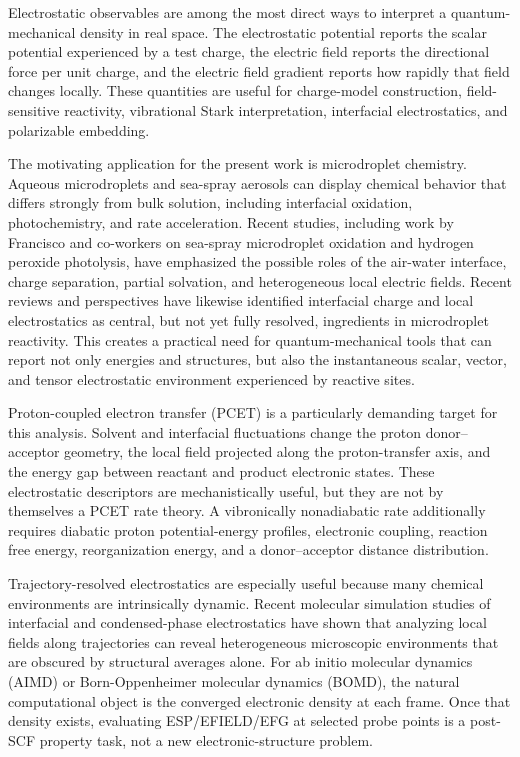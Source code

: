 \documentclass[journal=jctcce,manuscript=article,email=false]{achemso}
\begin{document}
Electrostatic observables are among the most direct ways to interpret a
quantum-mechanical density in real space.  The electrostatic potential
reports the scalar potential experienced by a test charge, the electric
field reports the directional force per unit charge, and the electric
field gradient reports how rapidly that field changes locally.  These
quantities are useful for charge-model construction, field-sensitive
reactivity, vibrational Stark interpretation, interfacial electrostatics,
and polarizable embedding.

The motivating application for the present work is microdroplet chemistry.
Aqueous microdroplets and sea-spray aerosols can display chemical behavior
that differs strongly from bulk solution, including interfacial oxidation,
photochemistry, and rate acceleration.  Recent studies, including work by
Francisco and co-workers on sea-spray microdroplet oxidation and hydrogen
peroxide photolysis, have emphasized the possible roles of the air-water
interface, charge separation, partial solvation, and heterogeneous local
electric fields.\cite{RaoFranciscoThiol2023,RaoFranciscoH2O22023}
Recent reviews and perspectives have likewise identified interfacial
charge and local electrostatics as central, but not yet fully resolved,
ingredients in microdroplet reactivity.\cite{LaCourHeadGordon2025}
This creates a practical need for quantum-mechanical tools that can report
not only energies and structures, but also the instantaneous scalar,
vector, and tensor electrostatic environment experienced by reactive
sites.

Proton-coupled electron transfer (PCET) is a particularly demanding target
for this analysis.  Solvent and interfacial fluctuations change the
proton donor--acceptor geometry, the local field projected along the
proton-transfer axis, and the energy gap between reactant and product
electronic states.  These electrostatic descriptors are mechanistically
useful, but they are not by themselves a PCET rate theory.  A
vibronically nonadiabatic rate additionally requires diabatic proton
potential-energy profiles, electronic coupling, reaction free energy,
reorganization energy, and a donor--acceptor distance distribution.\cite{HutchisonCuiPCET2025}

Trajectory-resolved electrostatics are especially useful because many
chemical environments are intrinsically dynamic.  Recent molecular
simulation studies of interfacial and condensed-phase electrostatics have
shown that analyzing local fields along trajectories can reveal
heterogeneous microscopic environments that are obscured by structural
averages alone.\cite{MartinsCostaRuizLopez2023}  For ab initio molecular
dynamics (AIMD) or Born-Oppenheimer molecular dynamics (BOMD), the natural
computational object is the converged electronic density at each frame.
Once that density exists, evaluating ESP/EFIELD/EFG at selected probe
points is a post-SCF property task, not a new electronic-structure problem.
\end{document}

